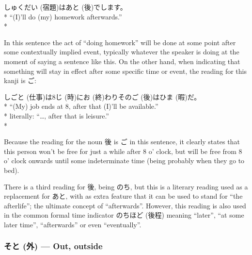 \documentclass[11pt, b5paper, twoside, openright, onecolumn]{book}
\makeatletter
\newcommand*{\rubystack}[2]{{\relscale{0.5}%
  \begin{tabular}[b]{@{}c@{}}%
    {#1}\\%
   {\textscale{2}{#2}}%
  \end{tabular}}%
}
\DeclareRobustCommand*{\ruby}[2]{%
  \mbox{%
    \setlength{\parskip}{0ex}%
    \BeginAccSupp{method=pdfstringdef,ActualText={#1}}%
      \rubystack{\phantom{#2}}{#1}%
      \llap{%
        \rubystack{#2}{\phantom{#1}}%
      }%
    \EndAccSupp{}%
  }%
}
\renewcommand*{\ruby}[2]{#2 (#1)}%
\newenvironment{exampleblock}{
\setlength{\parindent}{0.6in}
\begin{minipage}[t]{\dimexpr\textwidth-\parindent}}
{\end{minipage}}
\makeatother
\begin{document}
\vspace{0.4cm}
\begin{exampleblock}
\ruby{宿題}{しゅくだい}は\ruby{後}{あと}でします。 \\* 
“(I)’ll do (my) homework afterwards.” \\* 
\end{exampleblock}
\vspace{0.2cm}

In this sentence the act of “doing homework” will be done at some point after some contextually implied event‚ typically whatever the speaker is doing at the moment of saying a sentence like this. On the other hand‚ when indicating that something will stay in effect after some specific time or event‚ the reading for this kanji is ご:

\vspace{0.4cm}
\begin{exampleblock}
\ruby{仕事}{しごと}は8\ruby{時}{じ}に\ruby{終}{お}わりその\ruby{後}{ご}は\ruby{暇}{ひま}だ。 \\* 
“(My) job ends at 8‚ after that (I)’ll be available.” \\* 
literally: “…‚ after that is leisure.” \\* 
\end{exampleblock}
\vspace{0.2cm}

Because the reading for the noun 後 is ご in this sentence‚ it clearly states that this person won’t be free for just a while after 8 o’ clock‚ but will be free from 8 o’ clock onwards until some indeterminate time (being probably when they go to bed).

There is a third reading for 後‚ being のち‚ but this is a literary reading used as a replacement for あと‚ with as extra feature that it can be used to stand for “the afterlife”; the ultimate concept of “afterwards”. However‚ this reading is also used in the common formal time indicator のちほど (後程) meaning “later”‚ “at some later time”‚ “afterwards” or even “eventually”.

\subsubsection{\ruby{外}{そと} — Out‚ outside}
\end{document}
